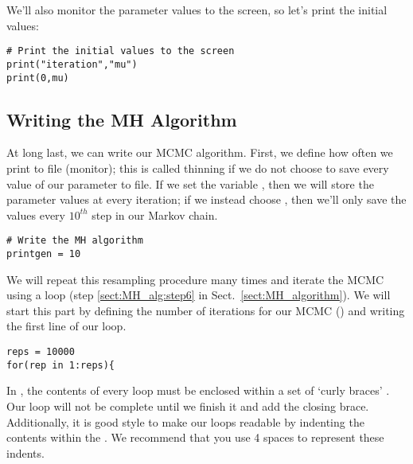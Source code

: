 We'll also monitor the parameter values to the screen, so let's print the initial values:
{\tt \begin{snugshade*}
\begin{lstlisting}
# Print the initial values to the screen
print("iteration","mu")
print(0,mu)
\end{lstlisting}
\end{snugshade*}}

\subsection{Writing the MH Algorithm}
At long last, we can write our MCMC algorithm.
First, we define how often we print to file (\IE monitor); this is called thinning if we do not choose to save every value of our parameter to file.
If we set the variable , then we will store the parameter values at every iteration; if we instead choose , then we'll only save the values every $10^{th}$ step in our Markov chain.
{\tt \begin{snugshade*}
\begin{lstlisting}
# Write the MH algorithm    
printgen = 10
\end{lstlisting}
\end{snugshade*}}
We will repeat this resampling procedure many times and iterate the MCMC using a  loop (\EG step \ref{sect:MH_alg:step6} in Sect.\ \ref{sect:MH_algorithm}). 
We will start this part by defining the number of iterations for our MCMC () and writing the first line of our  loop. 
{\tt \begin{snugshade*}
\begin{lstlisting}
reps = 10000 
for(rep in 1:reps){
\end{lstlisting}
\end{snugshade*}}
In \Rev, the contents of every  loop must be enclosed within a set of  `curly braces' . Our loop will not be complete until we finish it and add the closing brace. 
Additionally, it is good style to make our loops readable by indenting the contents within the . 
We recommend that you use 4 spaces to represent these indents.

